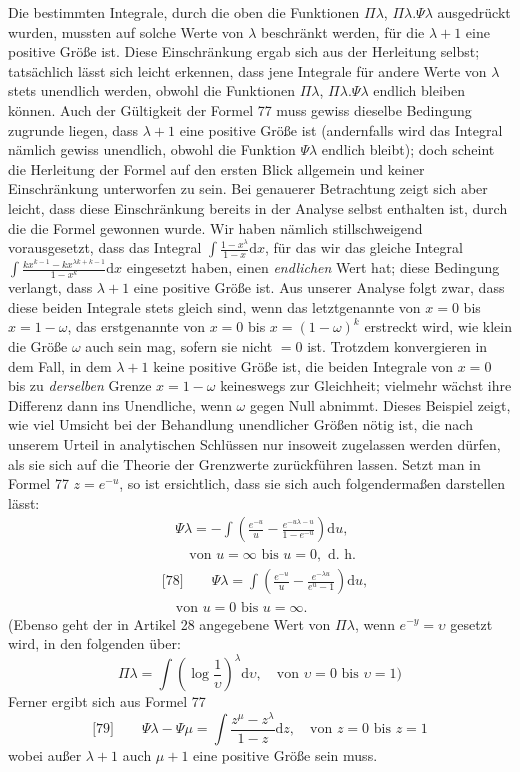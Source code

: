 Die bestimmten Integrale, durch die oben die Funktionen $\Pi\lambda$, $\Pi\lambda.\Psi\lambda$ ausgedrückt wurden, mussten auf solche Werte von $\lambda$ beschränkt werden, für die $\lambda+1$ eine positive Größe ist. Diese Einschränkung ergab sich aus der Herleitung selbst; tatsächlich lässt sich leicht erkennen, dass jene Integrale für andere Werte von $\lambda$ stets unendlich werden, obwohl die Funktionen $\Pi\lambda$, $\Pi\lambda.\Psi\lambda$ endlich bleiben können. Auch der Gültigkeit der Formel 77 muss gewiss dieselbe Bedingung zugrunde liegen, dass $\lambda+1$ eine positive Größe ist (andernfalls wird das Integral nämlich gewiss unendlich, obwohl die Funktion $\Psi\lambda$ endlich bleibt); doch scheint die Herleitung der Formel auf den ersten Blick allgemein und keiner Einschränkung unterworfen zu sein. Bei genauerer Betrachtung zeigt sich aber leicht, dass diese Einschränkung bereits in der Analyse selbst enthalten ist, durch die die Formel gewonnen wurde. Wir haben nämlich stillschweigend vorausgesetzt, dass das Integral $\int\frac{1-x^\lambda}{1-x}\mathrm{d}x$, für das wir das gleiche Integral $\int\frac{kx^{k-1}-kx^{\lambda k+k-1}}{1-x^k}\mathrm{d}x$ eingesetzt haben, einen \emph{endlichen} Wert hat; diese Bedingung verlangt, dass $\lambda+1$ eine positive Größe ist. Aus unserer Analyse folgt zwar, dass diese beiden Integrale stets gleich sind, wenn das letztgenannte von $x=0$ bis $x=1-\omega$, das erstgenannte von $x=0$ bis $x=(1-\omega)^k$ erstreckt wird, wie klein die Größe $\omega$ auch sein mag, sofern sie nicht $=0$ ist. Trotzdem konvergieren in dem Fall, in dem $\lambda+1$ keine positive Größe ist, die beiden Integrale von $x=0$ bis zu \emph{derselben} Grenze $x=1-\omega$ keineswegs zur Gleichheit; vielmehr wächst ihre Differenz dann ins Unendliche, wenn $\omega$ gegen Null abnimmt. Dieses Beispiel zeigt, wie viel Umsicht bei der Behandlung unendlicher Größen nötig ist, die nach unserem Urteil in analytischen Schlüssen nur insoweit zugelassen werden dürfen, als sie sich auf die Theorie der Grenzwerte zurückführen lassen.
Setzt man in Formel 77 $z=e^{-u}$, so ist ersichtlich, dass sie sich auch folgendermaßen darstellen lässt:
\[
\begin{aligned}
&\Psi\lambda=-\int\left(\frac{e^{-u}}{u}-\frac{e^{-u\lambda-u}}{1-e^{-u}}\right)\mathrm{d}u,
\\[4pt]
&\quad\text{von }u=\infty\text{ bis }u=0,\text{ d. h.}
\end{aligned}
\]
\[
\begin{aligned}
&\text{[78]}\qquad
\Psi\lambda=\int\left(\frac{e^{-u}}{u}-\frac{e^{-\lambda u}}{e^u-1}\right)\mathrm{d}u,
\\[4pt]
&\quad\text{von }u=0\text{ bis }u=\infty.
\end{aligned}
\]
(Ebenso geht der in Artikel 28 angegebene Wert von $\Pi\lambda$, wenn $e^{-y}=\upsilon$ gesetzt wird, in den folgenden über:
\[
\Pi\lambda=\int\left(\log\frac{1}{\upsilon}\right)^\lambda\mathrm{d}\upsilon,
\quad\text{von }\upsilon=0\text{ bis }\upsilon=1)
\]
Ferner ergibt sich aus Formel 77
\[
\text{[79]}\qquad
\Psi\lambda-\Psi\mu=\int\frac{z^\mu-z^\lambda}{1-z}\mathrm{d}z,
\quad\text{von }z=0\text{ bis }z=1
\]
wobei außer $\lambda+1$ auch $\mu+1$ eine positive Größe sein muss.

